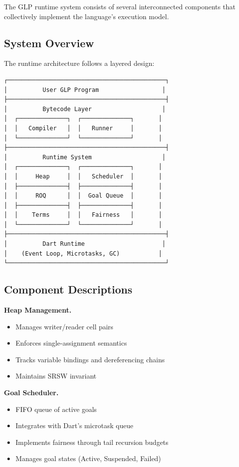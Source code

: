 \documentclass[runningheads,thm-restate]{llncs}
\newcommand{\mypara}[1]{\smallskip\noindent\textbf{#1.}}
\begin{document}
The GLP runtime system consists of several interconnected components that collectively implement the language's execution model.

\subsection{System Overview}

The runtime architecture follows a layered design:

\begin{verbatim}
┌─────────────────────────────────────────────┐
│          User GLP Program                  │
├─────────────────────────────────────────────┤
│          Bytecode Layer                    │
│  ┌──────────────┐  ┌──────────────┐       │
│  │   Compiler   │  │   Runner     │       │
│  └──────────────┘  └──────────────┘       │
├─────────────────────────────────────────────┤
│          Runtime System                    │
│  ┌──────────────┐  ┌──────────────┐       │
│  │     Heap     │  │   Scheduler  │       │
│  ├──────────────┤  ├──────────────┤       │
│  │     ROQ      │  │  Goal Queue  │       │
│  ├──────────────┤  ├──────────────┤       │
│  │    Terms     │  │   Fairness   │       │
│  └──────────────┘  └──────────────┘       │
├─────────────────────────────────────────────┤
│          Dart Runtime                      │
│    (Event Loop, Microtasks, GC)           │
└─────────────────────────────────────────────┘
\end{verbatim}

\subsection{Component Descriptions}

\mypara{Heap Management}
\begin{itemize}
\item Manages writer/reader cell pairs
\item Enforces single-assignment semantics
\item Tracks variable bindings and dereferencing chains
\item Maintains SRSW invariant
\end{itemize}

\mypara{Goal Scheduler}
\begin{itemize}
\item FIFO queue of active goals
\item Integrates with Dart's microtask queue
\item Implements fairness through tail recursion budgets
\item Manages goal states (Active, Suspended, Failed)
\end{itemize}
\end{document}
